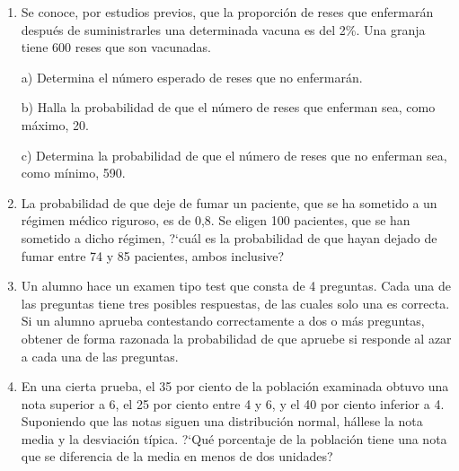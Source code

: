 \begin{adjustwidth}{20pt}{10pt}
\begin{enumerate}[PB. 1. ]
		\hspace{-1cm}\vspace{1cm}
		
		\item 	Se conoce, por estudios previos, que la proporción de reses que enfermarán después de suministrarles una determinada vacuna es del 2\%. Una granja tiene 600 reses que son vacunadas.

	a) Determina el número esperado de reses que no enfermarán.

	b) Halla la probabilidad de que el número de reses que enferman sea, como máximo, 20.

	c) Determina la probabilidad de que el número de reses que no enferman sea, como mínimo, 590.
		
	\hspace{-1cm}\vspace{1cm}
		
		\item 	La probabilidad de que deje de fumar un paciente, que se ha sometido a un régimen médico riguroso, es de 0,8. Se eligen 100 pacientes, que se han sometido a dicho régimen, ?`cuál es la probabilidad de que hayan dejado de fumar entre 74 y 85 pacientes, ambos inclusive?

		\hspace{-1cm}\vspace{1cm}
		
		\item 	Un alumno hace un examen tipo test que consta de 4 preguntas. Cada una de las preguntas tiene tres posibles respuestas, de las cuales solo una es correcta. Si un alumno aprueba contestando correctamente a dos o más preguntas, obtener de forma razonada la probabilidad de que apruebe si responde al azar a cada una de las preguntas.
		
		\hspace{-1cm}\vspace{1cm}
		
		
		
		\item 	 En una cierta prueba, el 35 por ciento de la población examinada obtuvo una nota superior a 6, el 25 por ciento entre 4 y 6, y el 40 por ciento inferior a 4. Suponiendo que las notas siguen una distribución normal, hállese la nota media y la desviación típica. ?`Qué porcentaje de la población tiene una nota que se diferencia de la media en menos de dos unidades?
		

\end{enumerate}
\end{adjustwidth}
